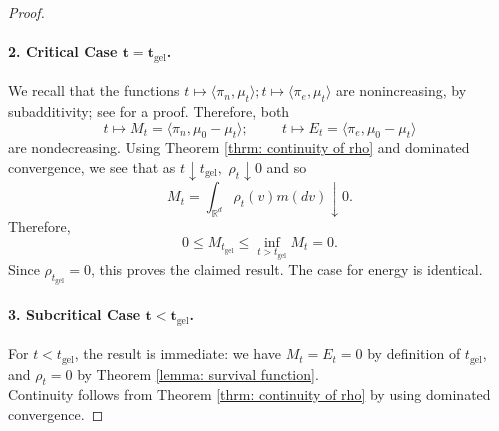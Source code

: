 \begin{proof}
\paragraph{2. Critical Case $\mathbf{t=t_\mathrm{gel}}$.} We recall  that the functions $t\mapsto \langle \pi_n, \mu_t\rangle; t\mapsto \langle \pi_e, \mu_t\rangle$ are nonincreasing, by subadditivity; see \cite{N00} for a proof. Therefore, both \begin{equation}
    t\mapsto M_t=\langle \pi_n, \mu_0-\mu_t\rangle;\hspace{1cm}  t\mapsto E_t=\langle \pi_e, \mu_0-\mu_t\rangle 
\end{equation} are nondecreasing. Using Theorem \ref{thrm: continuity of rho} and dominated convergence, we see that as $t\downarrow t_\mathrm{gel},$ $\rho_t\downarrow 0$ and so \begin{equation}
    M_t =\int_{\mathbb{R}^d} \rho_t(v)m(dv) \downarrow 0. 
\end{equation} Therefore, \begin{equation}
    0 \leq M_{t_\mathrm{gel}} \leq \inf_{t>t_\mathrm{gel}} M_t = 0. 
\end{equation} Since $\rho_{t_\mathrm{gel}}=0$, this proves the claimed result. The case for energy is identical.
\paragraph{3. Subcritical Case $\mathbf{t<t_\mathrm{gel}}$.} For $t<t_\mathrm{gel}$, the result is immediate: we have $M_t=E_t=0$ by definition of $t_\mathrm{gel}$, and $\rho_t=0$ by Theorem \ref{lemma: survival function}. \medskip \\ Continuity follows from Theorem \ref{thrm: continuity of rho} by using dominated convergence. \end{proof}


